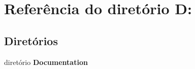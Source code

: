 \section{Referência do diretório D\+:}
\label{dir_275089585c7fc1b5fd5d7d42c69cb1da}
\subsection*{Diretórios}
\begin{DoxyCompactItemize}
\item 
diretório \textbf{ Documentation}
\end{DoxyCompactItemize}
